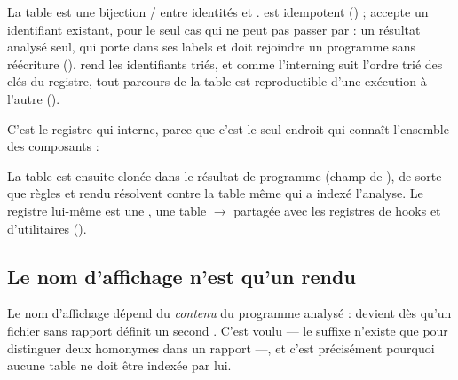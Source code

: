 
La table est une bijection  /  entre identités et
.  est idempotent
() ;  accepte un identifiant existant, pour
le seul cas qui ne peut pas passer par  : un résultat analysé seul, qui porte
 dans ses labels et doit rejoindre un programme sans réécriture
().  rend les identifiants triés, et comme
l'interning suit l'ordre trié des clés du registre, tout parcours de la table est
reproductible d'une exécution à l'autre ().

C'est le registre qui interne, parce que c'est le seul endroit qui connaît l'ensemble des
composants :


La table est ensuite clonée dans le résultat de programme (champ  de
), de sorte que règles et rendu résolvent contre
la table même qui a indexé l'analyse. Le registre lui-même est une ,
une table  $\to$  partagée avec les registres de hooks
et d'utilitaires ().

\subsection{Le nom d'affichage n'est qu'un rendu}


Le nom d'affichage dépend du \emph{contenu} du programme analysé :  devient
 dès qu'un fichier sans rapport définit un second .
C'est voulu --- le suffixe n'existe que pour distinguer deux homonymes dans un rapport ---, et
c'est précisément pourquoi aucune table ne doit être indexée par lui.

